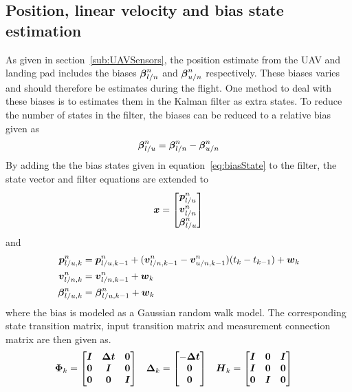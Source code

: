\subsection{Position, linear velocity and bias state estimation}\label{ssub:pos_vel_and_bias_state}
As given in section~\ref{sub:UAVSensors}, the position estimate from the UAV and landing pad includes the biases $\boldsymbol{\beta}_{l/n}^{n}$ and $\boldsymbol{\beta}_{u/n}^{n}$ respectively. These biases varies and should therefore be estimates during the flight. One method to deal with these biases is to estimates them in the Kalman filter as extra states. To reduce the number of states in the filter, the biases can be reduced to a relative bias given as
\begin{equation}\label{eq:biasState}
    \boldsymbol{\beta}_{l/u}^{n}=\boldsymbol{\beta}_{l/n}^{n}-\boldsymbol{\beta}_{u/n}^{n}
\end{equation}
By adding the the bias states given in equation~\ref{eq:biasState} to the filter, the state vector and filter equations are extended to
\begin{equation}
    \boldsymbol{x}
    =
    \begin{bmatrix}
        \boldsymbol{p}^{n}_{l/u}\\
        \boldsymbol{v}^{n}_{l/n}\\
        \boldsymbol{\beta}_{l/u}^{n}
    \end{bmatrix}
\end{equation}
and
\begin{align}
    \boldsymbol{p}^{n}_{l/u,k}&=\boldsymbol{p}^{n}_{l/u,k-1}+(\boldsymbol{v}^{n}_{l/n,k-1}-\boldsymbol{v}^{n}_{u/n,k-1})(t_{k}-t_{k-1})+\boldsymbol{w}_k\\
    \boldsymbol{v}^{n}_{l/n,k}&=\boldsymbol{v}^{n}_{l/n,k-1}+\boldsymbol{w}_k\\
    \boldsymbol{\beta}_{l/u,k}^{n}&=\boldsymbol{\beta}_{l/u,k-1}^{n}+\boldsymbol{w}_k
\end{align}
where the bias is modeled as a Gaussian random walk model. The corresponding state transition matrix, input transition matrix and measurement connection matrix are then given as.
\begin{align}\label{eq:mat_pos_bias}
    \boldsymbol{\Phi}_k&=
    \begin{bmatrix}
        \boldsymbol{I} & \boldsymbol{\Delta t} & \boldsymbol{0}\\
        \boldsymbol{0} & \boldsymbol{I} & \boldsymbol{0}\\
        \boldsymbol{0} & \boldsymbol{0} & \boldsymbol{I}
    \end{bmatrix}
    &
    \boldsymbol{\Delta}_k&=
    \begin{bmatrix}
        -\boldsymbol{\Delta t}\\
        \boldsymbol{0}\\
        \boldsymbol{0}
    \end{bmatrix}
    &
    \boldsymbol{H}_k&=
    \begin{bmatrix}
        \boldsymbol{I} & \boldsymbol{0} & \boldsymbol{I}\\
        \boldsymbol{I} & \boldsymbol{0} & \boldsymbol{0}\\
        \boldsymbol{0} & \boldsymbol{I} & \boldsymbol{0}
    \end{bmatrix}
\end{align}
